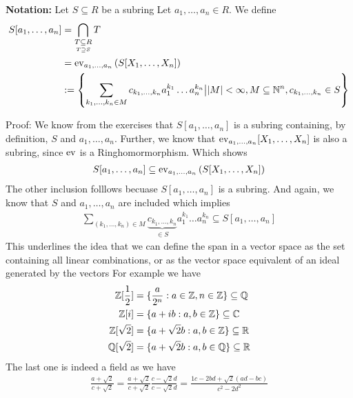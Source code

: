 
\textbf{Notation:} Let $S \subseteq R$ be a subring Let $a_{1}, \ldots, a_{n} \in R$. We define 
\begin{align*}
	S[a_1, \ldots, a_n] &= \bigcap_{\underset{T \supseteq S}{T \subseteq R}} T\\
											&= \operatorname{ev}_{a_{1}, \ldots, a_{n}} \left(S[X_1, \ldots, X_n]\right)\\
											&:= \left\{ \sum_{k_1, \ldots, k_n \in M} c_{k_{1}, \ldots, k_{n}}a_1^{k_1} \dots a_n^{k_n} \big\vert \vert M\vert < \infty, M \subseteq \mathbb{N}^n, c_{k_{1}, \ldots, k_{n}} \in S\right\}
\end{align*}

Proof: We know from the exercises that $S[a_{1}, \ldots, a_{n}]$ is a subring containing, by definition, $S$ and $a_{1}, \ldots, a_{n}$. Further, we know that $\operatorname{ev}_{a_{1}, \ldots, a_{n}}[X_{1}, \ldots, X_{n}]$ is also a subring, since $\operatorname{ev}$ is a Ringhomormorphism. Which shows
\begin{align*}
	S[a_{1}, \ldots, a_{n}] \subseteq \operatorname{ev}_{a_{1}, \ldots, a_{n}} \left(S[X_{1}, \ldots, X_{n}]\right)
\end{align*}
The other inclusion folllows becuase $S[a_{1}, \ldots, a_{n}]$ is a subring. And again, we know that $S$ and $a_{1}, \ldots, a_{n}$ are included which implies
\begin{align*}
	\sum_{(k_{1}, \ldots, k_{n}) \in M}\underbrace{c_{k_{1}, \ldots, k_{n}}}_{\in S}a_1^{k_1} \dots a_n^{k_n} \subseteq S[a_{1}, \ldots, a_{n}]
\end{align*}
This underlines the idea that we can define the span in a vector space as the set containing all linear combinations, or as the vector space equivalent of an ideal generated by the vectors
For example we have
\begin{align*}
	\mathbb{Z}[\frac{1}{2}] &= \{\frac{a}{2^n}: a \in \mathbb{Z}, n \in \mathbb{Z}\}\subseteq \mathbb{Q}\\
	\mathbb{Z}[i] &= \{a + ib: a, b \in \mathbb{Z}\} \subseteq \mathbb{C}\\
	\mathbb{Z}[\sqrt{2}] &= \{a + \sqrt{2}b: a, b \in \mathbb{Z}\}\subseteq \mathbb{R}\\
	\mathbb{Q}[\sqrt{2}] &= \{a + \sqrt{2}b: a, b \in \mathbb{Q}\}\subseteq \mathbb{R}
\end{align*}
The last one is indeed a field as we have
\begin{align*}
	\frac{a + \sqrt{2}}{c + \sqrt{2}} =	\frac{a + \sqrt{2}}{c + \sqrt{2}} \frac{c - \sqrt{2}d}{c - \sqrt{2}d} = \frac{1c - 2bd + \sqrt{2}(ad - bc)}{c^2 - 2d^2}
\end{align*}



